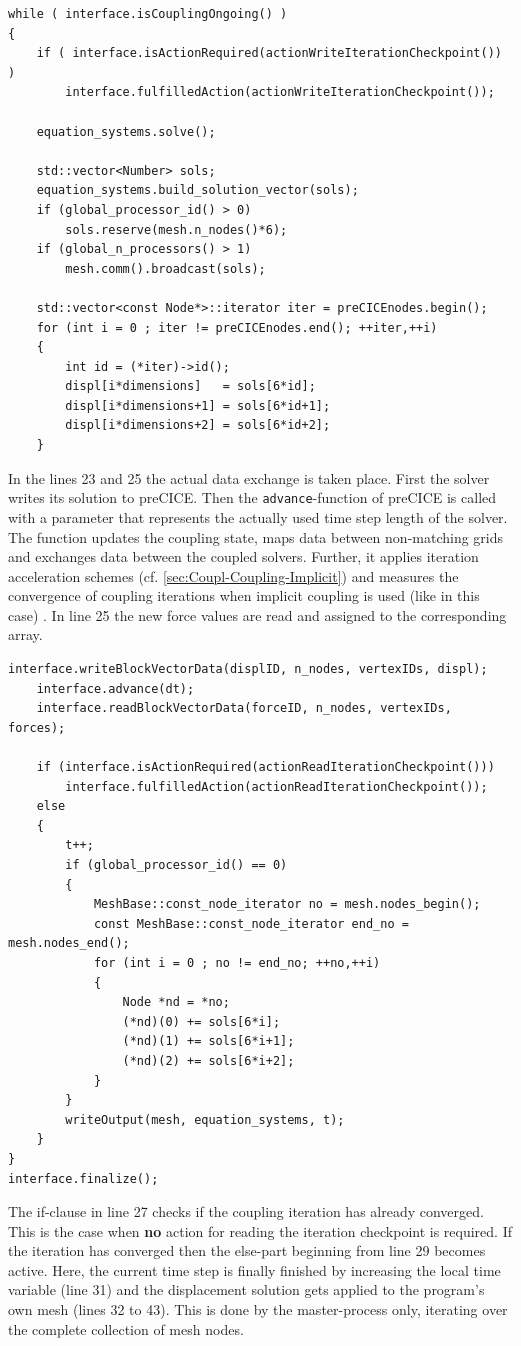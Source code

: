 \begin{lstlisting}[caption=preCICE main while-loop part 1,label=lst:preCICEint4a,keepspaces=true,name=while-loop]
while ( interface.isCouplingOngoing() )
{
	if ( interface.isActionRequired(actionWriteIterationCheckpoint()) )
		interface.fulfilledAction(actionWriteIterationCheckpoint());

	equation_systems.solve();

	std::vector<Number> sols;
	equation_systems.build_solution_vector(sols);
	if (global_processor_id() > 0)
		sols.reserve(mesh.n_nodes()*6);
	if (global_n_processors() > 1)
		mesh.comm().broadcast(sols);

	std::vector<const Node*>::iterator iter = preCICEnodes.begin();
	for (int i = 0 ; iter != preCICEnodes.end(); ++iter,++i)
	{
		int id = (*iter)->id();
		displ[i*dimensions]   = sols[6*id];
		displ[i*dimensions+1] = sols[6*id+1];
		displ[i*dimensions+2] = sols[6*id+2];
	}
\end{lstlisting}
   In the lines 23 and 25 the actual data exchange is taken place. First the solver writes its solution to preCICE. Then the \texttt{advance}-function of preCICE is called with a parameter that represents the actually used time step length of the solver. The function updates the coupling state, maps data between non-matching grids and exchanges data between the coupled solvers. Further, it applies iteration acceleration schemes (cf. \ref{sec:Coupl-Coupling-Implicit}) and measures the convergence of coupling iterations when implicit coupling is used (like in this case) \cite{gatzhammer2015efficient}. In line 25 the new force values are read and assigned to the corresponding array.

\begin{lstlisting}[caption=preCICE main while-loop part 2,label=lst:preCICEint4b,keepspaces=true,name=while-loop]
	interface.writeBlockVectorData(displID, n_nodes, vertexIDs, displ);
	interface.advance(dt);
	interface.readBlockVectorData(forceID, n_nodes, vertexIDs, forces);

	if (interface.isActionRequired(actionReadIterationCheckpoint()))
		interface.fulfilledAction(actionReadIterationCheckpoint());
	else
	{
		t++;
		if (global_processor_id() == 0)
		{
			MeshBase::const_node_iterator no = mesh.nodes_begin();
			const MeshBase::const_node_iterator end_no = mesh.nodes_end();
			for (int i = 0 ; no != end_no; ++no,++i)
			{
				Node *nd = *no;
				(*nd)(0) += sols[6*i];
				(*nd)(1) += sols[6*i+1];
				(*nd)(2) += sols[6*i+2];
			}
		}
		writeOutput(mesh, equation_systems, t);
	}
}
interface.finalize();
\end{lstlisting}
   The if-clause in line 27 checks if the coupling iteration has already converged. This is the case when \textbf{no} action for reading the iteration checkpoint is required. If the iteration has converged then the else-part beginning from line 29 becomes active. Here, the current time step is finally finished by increasing the local time variable (line 31) and the displacement solution gets applied to the program's own mesh (lines 32 to 43). This is done by the master-process only, iterating over the complete collection of mesh nodes.
   
